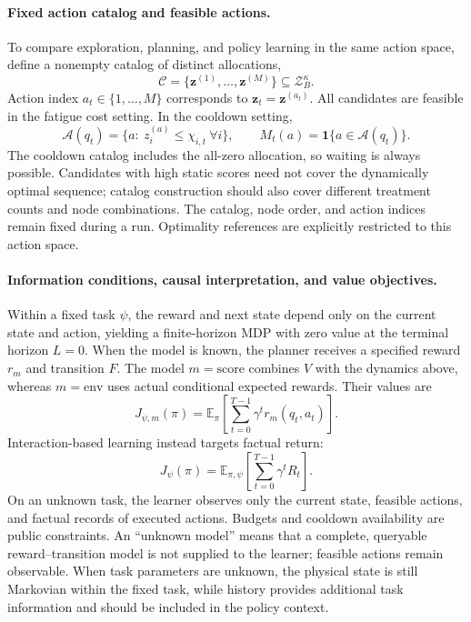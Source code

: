 \documentclass[a4paper,11pt]{article}
\newcommand{\E}{\mathbb E}
\newcommand{\ind}{\mathbf 1}
\numberwithin{equation}{section}
\begin{document}
\paragraph{Fixed action catalog and feasible actions.}
To compare exploration, planning, and policy learning in the same action space, define a nonempty catalog of distinct allocations,
\begin{equation}
\mathcal C=\{\mathbf z^{(1)},\ldots,\mathbf z^{(M)}\}\subseteq\mathcal Z_B^\kappa.
\label{eq:catalog}
\end{equation}
Action index $a_t\in\{1,\ldots,M\}$ corresponds to $\mathbf z_t=\mathbf z^{(a_t)}$. All candidates are feasible in the fatigue cost setting. In the cooldown setting,
\begin{equation}
\mathcal A(q_t)=\{a:\ z_i^{(a)}\leq\chi_{i,t}\ \forall i\},\qquad
M_t(a)=\ind\{a\in\mathcal A(q_t)\}.
\label{eq:feasible}
\end{equation}
The cooldown catalog includes the all-zero allocation, so waiting is always possible. Candidates with high static scores need not cover the dynamically optimal sequence; catalog construction should also cover different treatment counts and node combinations. The catalog, node order, and action indices remain fixed during a run. Optimality references are explicitly restricted to this action space.

\paragraph{Information conditions, causal interpretation, and value objectives.}
Within a fixed task $\psi$, the reward and next state depend only on the current state and action, yielding a finite-horizon MDP with zero value at the terminal horizon $L=0$. When the model is known, the planner receives a specified reward $r_m$ and transition $F$. The model $m=\mathrm{score}$ combines $\widehat V$ with the dynamics above, whereas $m=\mathrm{env}$ uses actual conditional expected rewards. Their values are
\begin{equation}
J_{\psi,m}(\pi)=\E_\pi\!\left[\sum_{t=0}^{T-1}\gamma^t r_m(q_t,a_t)\right].
\end{equation}
Interaction-based learning instead targets factual return:
\begin{equation}
J_\psi(\pi)=\E_{\pi,\psi}\!\left[\sum_{t=0}^{T-1}\gamma^tR_t\right].
\label{eq:return}
\end{equation}
On an unknown task, the learner observes only the current state, feasible actions, and factual records of executed actions. Budgets and cooldown availability are public constraints. An ``unknown model'' means that a complete, queryable reward--transition model is not supplied to the learner; feasible actions remain observable. When task parameters are unknown, the physical state is still Markovian within the fixed task, while history provides additional task information and should be included in the policy context.
\end{document}
